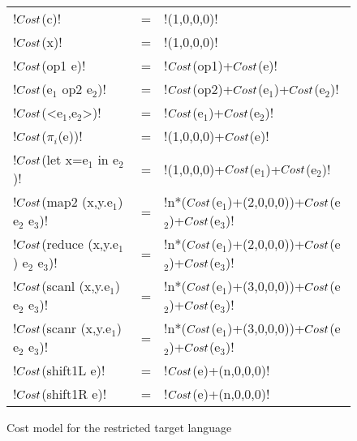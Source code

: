 \begin{figure*}[t]
    \begin{tabular}{|l c l|}
        \hline
      !$Cost$(c)! &=& !(1,0,0,0)! \\ 
      !$Cost$(x)! &=& !(1,0,0,0)! \\ 
      !$Cost$(op1 e)! &=& !$Cost$(op1)+$Cost$(e)! \\ 
      !$Cost$(e$_1$ op2 e$_2$)! &=& !$Cost$(op2)+$Cost$(e$_1$)+$Cost$(e$_2$)! \\ 
      !$Cost$(<e$_1$,e$_2$>)! &=& !$Cost$(e$_1$)+$Cost$(e$_2$)! \\ 
      !$Cost$($\pi_i$(e))! &=& !(1,0,0,0)+$Cost$(e)! \\ 
      !$Cost$(let x=e$_1$ in e$_2$)! &=& !(1,0,0,0)+$Cost$(e$_1$)+$Cost$(e$_2$)! \\ 
      !$Cost$(map2 (x,y.e$_1$) e$_2$ e$_3$)! &=& !n*($Cost$(e$_1$)+(2,0,0,0))+$Cost$(e$_2$)+$Cost$(e$_3$)! \\ 
      !$Cost$(reduce (x,y.e$_1$) e$_2$ e$_3$)! &=& !n*($Cost$(e$_1$)+(2,0,0,0))+$Cost$(e$_2$)+$Cost$(e$_3$)! \\ 
      !$Cost$(scanl (x,y.e$_1$) e$_2$ e$_3$)! &=& !n*($Cost$(e$_1$)+(3,0,0,0))+$Cost$(e$_2$)+$Cost$(e$_3$)! \\ 
      !$Cost$(scanr (x,y.e$_1$) e$_2$ e$_3$)! &=& !n*($Cost$(e$_1$)+(3,0,0,0))+$Cost$(e$_2$)+$Cost$(e$_3$)! \\ 
      !$Cost$(shift1L e)! &=& !$Cost$(e)+(n,0,0,0)! \\ 
      !$Cost$(shift1R e)! &=& !$Cost$(e)+(n,0,0,0)! \\ 
      \hline
    \end{tabular}
    \caption{Cost model for the restricted target language}
    \label{fig:costmodel}
\end{figure*}